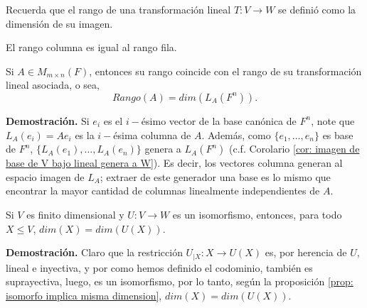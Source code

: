 Recuerda que el rango de una transformación
lineal $T: V \longrightarrow W$ se definió como la dimensión de
su imagen.

\begin{prop}
El rango columna es igual al rango fila. 
\end{prop}

\begin{prop}
	\label{prop: rango de matriz A coincide con rango de transf LA}
Si $A \in M_{m \times n}(F)$, entonces su rango coincide con el rango
de su transformación lineal asociada, o sea, 
\begin{equation}
	\label{eq: rango de matriz usando su transformacion lineal}
	Rango(A) = dim(L_{A}(F^{n})).
\end{equation}
\end{prop}
\noindent
\textbf{Demostración.}
Si $e_{i}$ es el $i-$ésimo vector de la base canónica de $F^{n}$, 
note que $L_{A}(e_{i}) = Ae_{i}$ es la $i-$ésima columna de $A$.
Además, como $\{ e_{1}, \ldots, e_{n} \}$ es base de
$F^{n}$, $\{ L_{A}(e_{1}), \ldots, L_{A}(e_{n}) \}$
genera a $L_{A}(F^{n})$ (c.f. Corolario
\ref{cor: imagen de base de V bajo lineal genera a W}). Es decir,
los vectores columna generan al espacio imagen de $L_{A}$; extraer
de este generador una base es lo mismo que encontrar la mayor
cantidad de columnas linealmente independientes de $A$.

\QEDB
\vspace{0.2cm}

\begin{prop}
	\label{prop: isomorfismos respetan dimension de subespacios}
Si $V$ es finito dimensional y $U: V \longrightarrow W$ es un isomorfismo,
entonces, para todo $X \leq V$, $dim(X) = dim(U(X))$.
\end{prop}
\noindent
\textbf{Demostración.}
Claro que la restricción
$U_{|X}: X \longrightarrow U(X)$ es, por herencia de $U$,
lineal e inyectiva, y por como hemos definido el codominio, también
es suprayectiva, luego, es un isomorfismo, por lo tanto, 
según la proposición 
\ref{prop: isomorfo implica misma dimension}, 
$dim(X) = dim(U(X))$.
\QEDB
\vspace{0.2cm}


